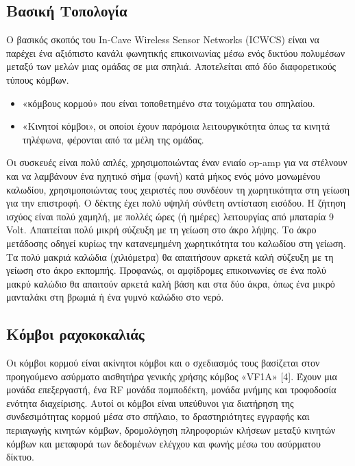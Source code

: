 \documentclass[12pt]{article}
\begin{document}
\begin{multicols*}{2}
    \section{\normalsize  \textsf{Βασική Τοπολογία}} Ο βασικός σκοπός του In-Cave Wireless Sensor Networks (ICWCS) είναι να παρέχει ένα αξιόπιστο κανάλι
    φωνητικής επικοινωνίας μέσω ενός δικτύου πολυμέσων μεταξύ των μελών μιας ομάδας σε μια σπηλιά. Αποτελείται από δύο διαφορετικούς τύπους κόμβων. 
    \begin{itemize}
        \item «κόμβους κορμού» που είναι τοποθετημένο στα τοιχώματα του σπηλαίου.
        \item «Κινητοί κόμβοι», οι οποίοι έχουν παρόμοια λειτουργικότητα όπως τα κινητά τηλέφωνα, φέρονται από τα μέλη της ομάδας.
    \end{itemize}

    Οι συσκευές είναι πολύ απλές, χρησιμοποιώντας έναν ενιαίο op-amp για να στέλνουν και να λαμβάνουν ένα ηχητικό σήμα (φωνή) κατά μήκος ενός μόνο μονωμένου
    καλωδίου, χρησιμοποιώντας τους χειριστές που συνδέουν τη χωρητικότητα στη γείωση για την επιστροφή. Ο δέκτης έχει πολύ υψηλή σύνθετη αντίσταση εισόδου. Η
    ζήτηση ισχύος είναι πολύ χαμηλή, με πολλές ώρες (ή ημέρες) λειτουργίας από μπαταρία 9 Volt. Απαιτείται πολύ μικρή σύζευξη με τη γείωση στο άκρο λήψης. Το
    άκρο μετάδοσης οδηγεί κυρίως την κατανεμημένη χωρητικότητα του καλωδίου στη γείωση. Τα πολύ μακριά καλώδια (χιλιόμετρα) θα απαιτήσουν αρκετά καλή σύζευξη με
    τη γείωση στο άκρο εκπομπής. Προφανώς, οι αμφίδρομες επικοινωνίες σε ένα πολύ μακρύ καλώδιο θα απαιτούν αρκετά καλή βάση και στα δύο άκρα, όπως ένα μικρό
    μανταλάκι στη βρωμιά ή ένα γυμνό καλώδιο στο νερό.

    \subsection{\small \textsf{Κόμβοι ραχοκοκαλιάς}} Οι κόμβοι κορμού είναι ακίνητοι κόμβοι και ο σχεδιασμός τους βασίζεται στον προηγούμενο ασύρματο αισθητήρα
        γενικής χρήσης κόμβος «VF1A» [4]. Έχουν μια μονάδα επεξεργαστή, ένα RF μονάδα πομποδέκτη, μονάδα μνήμης και τροφοδοσία ενότητα διαχείρισης. Αυτοί οι
        κόμβοι είναι υπεύθυνοι για διατήρηση της συνδεσιμότητας κορμού μέσα στο σπήλαιο, το δραστηριότητες εγγραφής και περιαγωγής κινητών κόμβων, δρομολόγηση
        πληροφοριών κλήσεων μεταξύ κινητών κόμβων και μεταφορά των δεδομένων ελέγχου και φωνής μέσω του ασύρματου δίκτυο.
    

\end{multicols*}
\end{document}
